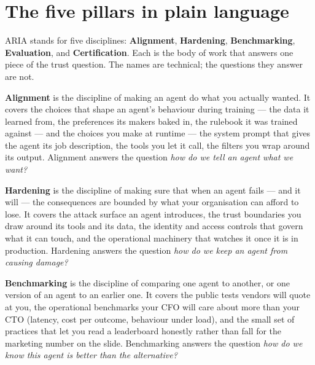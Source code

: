 \label{ch:about-aria}

\starttwocol

\section{The five pillars in plain language}

ARIA stands for five disciplines: \textbf{Alignment}, \textbf{Hardening}, \textbf{Benchmarking}, \textbf{Evaluation}, and \textbf{Certification}. Each is the body of work that answers one piece of the trust question. The names are technical; the questions they answer are not.

\textbf{Alignment} is the discipline of making an agent do what you actually wanted. It covers the choices that shape an agent's behaviour during training --- the data it learned from, the preferences its makers baked in, the rulebook it was trained against --- and the choices you make at runtime --- the system prompt that gives the agent its job description, the tools you let it call, the filters you wrap around its output. Alignment answers the question \textit{how do we tell an agent what we want?}

\textbf{Hardening} is the discipline of making sure that when an agent fails --- and it will --- the consequences are bounded by what your organisation can afford to lose. It covers the attack surface an agent introduces, the trust boundaries you draw around its tools and its data, the identity and access controls that govern what it can touch, and the operational machinery that watches it once it is in production. Hardening answers the question \textit{how do we keep an agent from causing damage?}

\textbf{Benchmarking} is the discipline of comparing one agent to another, or one version of an agent to an earlier one. It covers the public tests vendors will quote at you, the operational benchmarks your CFO will care about more than your CTO (latency, cost per outcome, behaviour under load), and the small set of practices that let you read a leaderboard honestly rather than fall for the marketing number on the slide. Benchmarking answers the question \textit{how do we know this agent is better than the alternative?}

